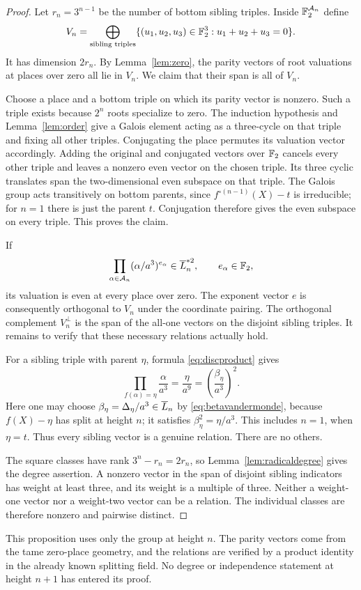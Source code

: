 \begin{proof}
Let $r_n=3^{n-1}$ be the number of bottom sibling triples.
Inside $\mathbb{F}_2^{\mathcal A_n}$ define
\[
 V_n=\bigoplus_{\text{sibling triples}}
       \{(u_1,u_2,u_3)\in\mathbb{F}_2^3:u_1+u_2+u_3=0\}.
\]
It has dimension $2r_n$. By Lemma~\ref{lem:zero}, the parity
vectors of root valuations at places over zero all lie in $V_n$.
We claim that their span is all of $V_n$.

Choose a place and a bottom triple on which its parity vector is
nonzero. Such a triple exists because $2^n$ roots specialize to
zero. The induction hypothesis and Lemma~\ref{lem:order} give a
Galois element acting as a three-cycle on that triple and fixing
all other triples. Conjugating the place permutes its valuation
vector accordingly. Adding the original and conjugated vectors
over $\mathbb{F}_2$ cancels every other triple and leaves a nonzero even
vector on the chosen triple. Its three cyclic translates span
the two-dimensional even subspace on that triple. The Galois
group acts transitively on bottom parents, since
$f^{\circ(n-1)}(X)-t$ is irreducible; for $n=1$ there is just
the parent $t$. Conjugation therefore gives the even subspace on
every triple. This proves the claim.

If
\[
 \prod_{\alpha\in\mathcal A_n}(\alpha/a^3)^{e_\alpha}
 \in\overline{L}_n^{*2},\qquad e_\alpha\in\mathbb{F}_2,
\]
its valuation is even at every place over zero. The exponent
vector $e$ is consequently orthogonal to $V_n$ under the
coordinate pairing. The orthogonal complement $V_n^\perp$ is
the span of the all-one vectors on the disjoint sibling triples.
It remains to verify that these necessary relations actually hold.

For a sibling triple with parent $\eta$, formula
\eqref{eq:discproduct} gives
\begin{equation}\label{eq:sibling-square}
 \prod_{f(\alpha)=\eta}\frac{\alpha}{a^3}
    =\frac{\eta}{a^9}
    =\left(\frac{\beta_\eta}{a^3}\right)^2.
\end{equation}
Here one may choose $\beta_\eta=\Delta_\eta/a^3\in\overline{L}_n$ by
\eqref{eq:betavandermonde}, because $f(X)-\eta$ has split at
height $n$; it satisfies $\beta_\eta^2=\eta/a^3$. This includes
$n=1$, when $\eta=t$. Thus every
sibling vector is a genuine relation. There are no others.

The square classes have rank $3^n-r_n=2r_n$, so
Lemma~\ref{lem:radicaldegree} gives the degree assertion. A
nonzero vector in the span of disjoint sibling indicators has
weight at least three, and its weight is a multiple of three.
Neither a weight-one vector nor a weight-two vector can be a
relation. The individual classes are therefore nonzero and
pairwise distinct.
\end{proof}

This proposition uses only the group at height $n$. The parity
vectors come from the tame zero-place geometry, and the relations
are verified by a product identity in the already known splitting
field. No degree or independence statement at height $n+1$ has
entered its proof.
